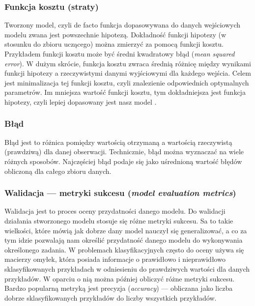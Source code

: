 \subsubsection{Funkcja kosztu (straty)}
Tworzony model, czyli de facto funkcja dopasowywana do danych wejściowych modelu zwana jest powszechnie hipotezą. Dokładność funkcji hipotezy (w stosunku do zbioru uczącego) można zmierzyć za pomocą funkcji kosztu. Przykładem funkcji kosztu może być średni kwadratowy błąd (\textit{mean squared error}). W dużym skrócie, funkcja kosztu zwraca średnią różnicę między wynikami funkcji hipotezy a rzeczywistymi danymi wyjściowymi dla każdego wejścia.
Celem jest minimalizacja tej funkcji kosztu, czyli znalezienie odpowiednich optymalnych parametrów. Im mniejsza wartość funkcji kosztu, tym dokładniejsza jest funkcja hipotezy, czyli lepiej dopasowany jest nasz model \cite{andrewng}.




\subsubsection{Błąd}
Błąd jest to różnica pomiędzy wartością otrzymaną a wartością rzeczywistą (prawdziwą) dla danej obserwacji. Technicznie, błąd można wyznaczać na wiele różnych sposobów. Najczęściej błąd podaje się jako uśrednioną wartość błędów obliczoną dla całego zbioru danych.

\subsubsection{Walidacja --- metryki sukcesu (\textit{model evaluation metrics})}
 Walidacja jest to proces oceny przydatności danego modelu. Do walidacji działania stworzonego modelu stosuje się różne metryki sukcesu. Sa to takie wielkości, które mówią jak dobrze dany model nauczył się generalizować, a co za tym idzie pozwalają nam określić przydatność danego modelu do wykonywania określonego zadania. W problemach klasyfikacyjnych często do oceny używa się macierzy omyłek, która posiada informacje o prawidłowo i nieprawidłowo sklasyfikowanych przykładach w odniesieniu do prawdziwych wartości dla danych przykładów. W oparciu o nią można później obliczyć różne metryki sukcesu. Bardzo popularną metryką jest precyzja (\textit{accuracy}) --- obliczana jako liczba dobrze sklasyfikowanych przykładów do liczby wszystkich przykładów.

